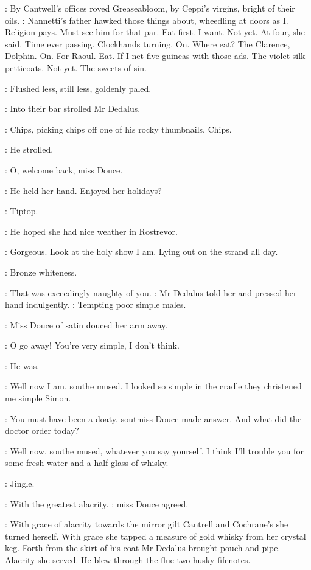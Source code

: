 :
By Cantwell's offices roved Greaseabloom, by Ceppi's virgins, bright
of their oils.
\BloomInt:
Nannetti's father hawked those things about, wheedling at
doors as I. Religion pays. Must see him for that par. Eat first. I want.
Not yet. At four, she said. Time ever passing. Clockhands turning. On.
Where eat? The Clarence, Dolphin. On. For Raoul. Eat. If I net five
guineas with those ads.
The violet silk petticoats. Not yet. The sweets
of sin.

:
Flushed less, still less, goldenly paled.

:
Into their bar strolled Mr Dedalus.

:
Chips, picking chips off one of his rocky thumbnails. Chips.

:
He strolled.

\Simon:
O, welcome back, miss Douce.

:
He held her hand. Enjoyed her holidays?

\MissD:
Tiptop.

:
He hoped she had nice weather in Rostrevor.

\MissD:
Gorgeous. Look at the holy show I am. Lying out on the strand
all day.

:
Bronze whiteness.

\Simon:
That was exceedingly naughty of you.
:
Mr Dedalus told her and pressed her hand indulgently.
\Simon:
Tempting poor simple males.

:
Miss Douce of satin douced her arm away.

\MissD:
O go away! You're very simple, I don't think.

:
He was.

\Simon:
Well now I am. sout{he mused.}
I looked so simple in the cradle they christened
me simple Simon.

\MissD:
You must have been a doaty.
sout{miss Douce made answer.}
And what did the doctor order today?

\Simon:
Well now.
sout{he mused,}
whatever you say yourself.
I think I'll trouble you
for some fresh water and a half glass of whisky.

:
Jingle.

\MissD:
With the greatest alacrity.
:
miss Douce agreed.

:
With grace of alacrity towards the mirror gilt Cantrell and
Cochrane's she turned herself. With grace she tapped a measure of gold
whisky from her crystal keg. Forth from the skirt of his coat Mr Dedalus
brought pouch and pipe. Alacrity she served. He blew through the flue two
husky fifenotes.

